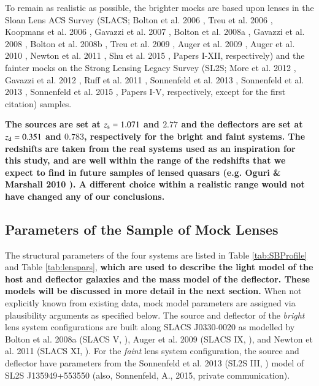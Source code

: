\documentclass[a4paper,11pt]{article}
\begin{document}
To remain as realistic as possible, the brighter mocks are based upon
lenses in the Sloan Lens ACS Survey (SLACS; Bolton et al. 2006
\cite{2006ApJ...638..703B}, Treu et al. 2006
\cite{2006ApJ...640..662T}, Koopmans et al. 2006
\cite{2006ApJ...649..599K}, Gavazzi et al. 2007
\cite{2007ApJ...667..176G}, Bolton et al. 2008a
\cite{2008ApJ...682..964B}, Gavazzi et al. 2008
\cite{2008ApJ...677.1046G}, Bolton et al. 2008b
\cite{2008ApJ...684..248B}, Treu et al. 2009
\cite{2009ApJ...690..670T}, Auger et al. 2009
\cite{2009ApJ...705.1099A}, Auger et al. 2010
\cite{2010ApJ...724..511A}, Newton et al. 2011
\cite{2011ApJ...734..104N}, Shu et al. 2015
\cite{2014arXiv1407.2240S}, Papers I-XII, respectively) and the fainter mocks on the Strong
Lensing Legacy Survey (SL2S; More et al. 2012
\cite{2012ApJ...749...38M}, Gavazzi et al. 2012 \cite{2012ApJ...761..170G},
Ruff et al. 2011 \cite{2011ApJ...727...96R}, Sonnenfeld et al. 2013
\cite{2013ApJ...777...97S}, Sonnenfeld et al. 2013
\cite{2013ApJ...777...98S}, Sonnenfeld et al. 2015
\cite{2015ApJ...800...94S}, Papers I-V, respectively, except for the
first citation) samples.

{\bf The sources are set at $z_{\rm s} = 1.071$ and $2.77$ and the
deflectors are set at $z_{\rm d} = 0.351$ and $0.783$, respectively
for the bright and faint systems. The redshifts are taken from the
real systems used as an inspiration for this study, and are well
within the range of the redshifts that we expect to find in future
samples of lensed quasars (e.g. Oguri \& Marshall 2010 
\cite{2010MNRAS.405.2579O}). A different choice within a realistic
range would not have changed any of our conclusions.}


\subsection{Parameters of the Sample of Mock Lenses}

The structural parameters of the four systems are listed in Table
\ref{tab:SBProfile} and Table \ref{tab:lenspars}, {\bf which are used to describe 
the light model of the host and deflector galaxies and the mass model of the deflector. 
These models will be discussed in more detail in the next section.} 
When not explicitly known from existing data,
mock model parameters are assigned via plausibility arguments as
specified below. The source and deflector of the \textit{bright} lens
system configurations are built along SLACS J0330-0020 as modelled by
Bolton et al. 2008a (SLACS V, \cite{2008ApJ...682..964B}), Auger et
al. 2009 (SLACS IX, \cite{2009ApJ...705.1099A}), and Newton et
al. 2011 (SLACS XI, \cite{2011ApJ...734..104N}). For the
\textit{faint} lens system configuration, the source and deflector
have parameters from the Sonnenfeld et al. 2013 (SL2S III,
\cite{2013ApJ...777...97S}) model of SL2S J135949+553550
(also, Sonnenfeld, A., 2015, private communication).
\end{document}
